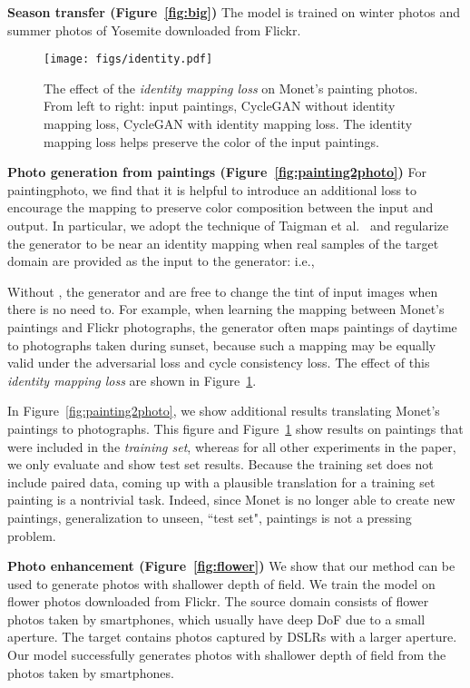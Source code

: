 \documentclass[10pt,twocolumn,letterpaper]{article}
\newcommand{\reffig}[1]{Figure~\ref{fig:#1}}
\newcommand{\lblfig}[1]{\label{fig:#1}}
\begin{document}
{\bf Season transfer (\reffig{big})}  The model is trained on  winter photos and  summer photos of Yosemite downloaded from Flickr.

\begin{figure}[t]
\begin{center}
\texttt{[image: figs/identity.pdf]}
\end{center}
 \vspace{-5 mm}
 \caption{The effect of the \textit{identity mapping loss} on Monet's painting photos. From left to right: input paintings, CycleGAN without identity mapping loss, CycleGAN with identity mapping loss. The identity mapping loss helps preserve the color of the input paintings. }
\lblfig{identity}
 \vspace{-6mm}
\end{figure}

{\bf Photo generation from paintings (\reffig{painting2photo})} 
For paintingphoto, we find that it is helpful to introduce an additional loss to encourage the mapping to preserve color composition between the input and output. In particular, we adopt the technique of Taigman et al.~\cite{taigman2016unsupervised} and regularize the generator to be near an identity mapping when real samples of the target domain are provided as the input to the generator: i.e.,  

Without , the generator  and  are free to change the tint of input images when there is no need to. For example, when learning the mapping between Monet's paintings and Flickr photographs, the generator often maps paintings of daytime to photographs taken during sunset, because such a mapping may be equally valid under the adversarial loss and cycle consistency loss. 
The effect of this \emph{identity mapping loss} are shown in \reffig{identity}.

In \reffig{painting2photo}, we show additional results translating Monet's paintings to photographs. This figure and \reffig{identity} show results on paintings that were included in the \emph{training set}, whereas for all other experiments in the paper, we only evaluate and show test set results. Because the training set does not include paired data, coming up with a plausible translation for a training set painting is a nontrivial task. Indeed, since Monet is no longer able to create new paintings, generalization to unseen, ``test set", paintings is not a pressing problem.

{\bf Photo enhancement (\reffig{flower})} We show that our method can be used to generate photos with shallower depth of field. We train the model on flower photos downloaded from Flickr. The source domain consists of flower photos taken by smartphones, which usually have deep DoF due to a small aperture. The target contains photos captured by DSLRs with a larger aperture. Our model successfully generates photos with shallower depth of field from the photos taken by smartphones. 
\end{document}
